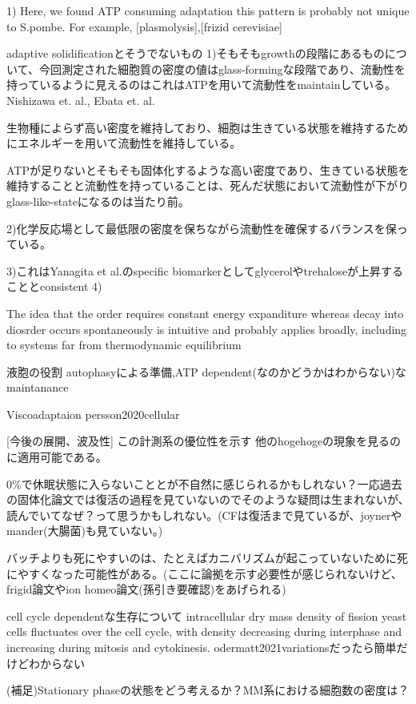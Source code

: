 1) Here, we found ATP consuming adaptation
this pattern is probably not unique to S.pombe. For example, [plasmolysis],[frizid cerevisiae]

adaptive solidificationとそうでないもの
1)そもそもgrowthの段階にあるものについて、今回測定された細胞質の密度の値はglass-formingな段階であり、流動性を持っているように見えるのはこれはATPを用いて流動性をmaintainしている。Nishizawa et. al., Ebata et. al.

生物種によらず高い密度を維持しており、細胞は生きている状態を維持するためにエネルギーを用いて流動性を維持している。

ATPが足りないとそもそも固体化するような高い密度であり、生きている状態を維持することと流動性を持っていることは、死んだ状態において流動性が下がりglass-like-stateになるのは当たり前。

2)化学反応場として最低限の密度を保ちながら流動性を確保するバランスを保っている。

3)これはYanagita et al.のspecific biomarkerとしてglycerolやtrehaloseが上昇することとconsistent
4)

 The idea that the order requires constant energy expanditure whereas decay into diosrder occurs spontaneously is intuitive and probably applies broadly, including to systems far from thermodynamic equilibrium

液胞の役割
autophasyによる準備,ATP dependent(なのかどうかはわからない)なmaintanance

Viscoadaptaion
persson2020cellular

[今後の展開、波及性]
この計測系の優位性を示す
他のhogehogeの現象を見るのに適用可能である。

0\%で休眠状態に入らないこととが不自然に感じられるかもしれない？一応過去の固体化論文では復活の過程を見ていないのでそのような疑問は生まれないが、読んでいてなぜ？って思うかもしれない。(CFは復活まで見ているが、joynerやmander(大腸菌)も見ていない。)

バッチよりも死にやすいのは、たとえばカニバリズムが起こっていないために死にやすくなった可能性がある。(ここに論拠を示す必要性が感じられないけど、frigid論文やion homeo論文(孫引き要確認)をあげられる)

cell cycle dependentな生存について
intracellular dry mass density of fission yeast cells fluctuates over the cell cycle, with density decreasing during interphase and increasing during mitosis and cytokinesis. odermatt2021variationsだったら簡単だけどわからない

(補足)Stationary phaseの状態をどう考えるか？MM系における細胞数の密度は？

